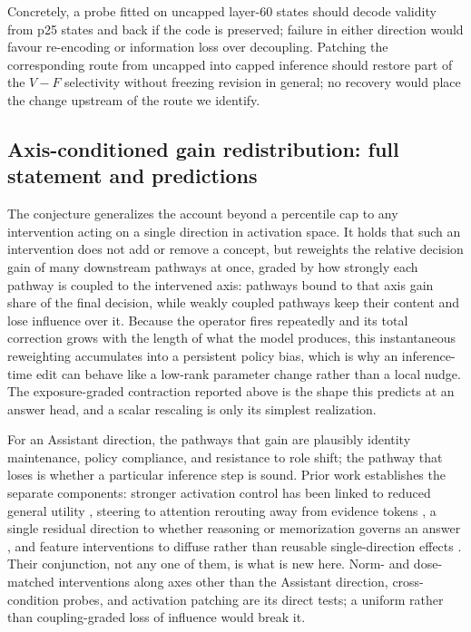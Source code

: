 \documentclass[letterpaper]{article}
\begin{document}
Concretely, a probe fitted on uncapped layer-60 states should decode validity from p25 states and back if the code is preserved; failure in either direction would favour re-encoding or information loss over decoupling. Patching the corresponding route from uncapped into capped inference should restore part of the $V-F$ selectivity without freezing revision in general; no recovery would place the change upstream of the route we identify.

\subsection{Axis-conditioned gain redistribution: full statement and predictions}

The conjecture generalizes the account beyond a percentile cap to any intervention acting on a single direction in activation space. It holds that such an intervention does not add or remove a concept, but reweights the relative decision gain of many downstream pathways at once, graded by how strongly each pathway is coupled to the intervened axis: pathways bound to that axis gain share of the final decision, while weakly coupled pathways keep their content and lose influence over it. Because the operator fires repeatedly and its total correction grows with the length of what the model produces, this instantaneous reweighting accumulates into a persistent policy bias, which is why an inference-time edit can behave like a low-rank parameter change rather than a local nudge. The exposure-graded contraction reported above is the shape this predicts at an answer head, and a scalar rescaling is only its simplest realization.

For an Assistant direction, the pathways that gain are plausibly identity maintenance, policy compliance, and resistance to role shift; the pathway that loses is whether a particular inference step is sound. Prior work establishes the separate components: stronger activation control has been linked to reduced general utility \citep{xu2026steering}, steering to attention rerouting away from evidence tokens \citep{luo2026focus}, a single residual direction to whether reasoning or memorization governs an answer \citep{hong2025reasoning}, and feature interventions to diffuse rather than reusable single-direction effects \citep{hoang2026sae}. Their conjunction, not any one of them, is what is new here. Norm- and dose-matched interventions along axes other than the Assistant direction, cross-condition probes, and activation patching are its direct tests; a uniform rather than coupling-graded loss of influence would break it.
\end{document}
